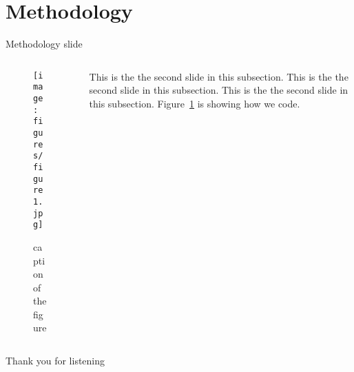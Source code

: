 \documentclass[aspectratio=169]{beamer}
\begin{document}
\section{Methodology}

\begin{frame}{Methodology slide}
    \begin{columns}
        \begin{column}{0.65\textwidth}
            \begin{figure}
                \texttt{[image: figures/figure1.jpg]}\\
                \caption{caption of the figure}
                \label{fig:figure1}
            \end{figure}
        \end{column}
        \begin{column}{0.35\textwidth}
            This is the the second slide in this subsection.
            This is the the second slide in this subsection.
            This is the the second slide in this subsection.
            Figure~\ref{fig:figure1} is showing how we code.
        \end{column}
    \end{columns}
\end{frame}

\begin{frame}{}
Thank you for listening
\end{frame}

\begin{frame}
\printbibliography
\end{frame}
\end{document}
